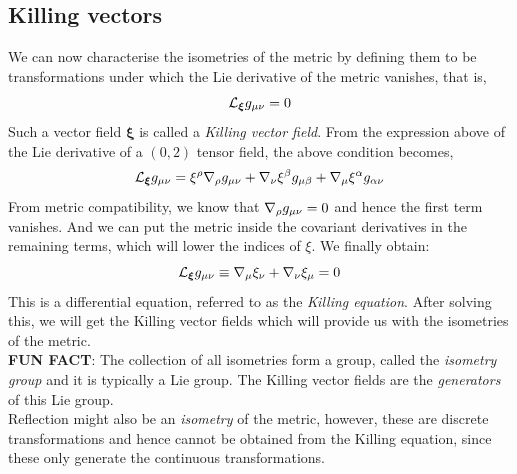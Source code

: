 \subsection{Killing vectors}
We can now characterise the isometries of the metric by defining them to be transformations under which the Lie derivative of the metric vanishes, that is, 
$$\mathcal L_{\boldsymbol{\xi}}g_{\mu\nu} = 0$$
Such a vector field $\boldsymbol{\xi}$ is called a \textit{Killing vector field}. From the expression above of the Lie derivative of a $(0,2)$ tensor field, the above condition becomes,
$$\mathcal L_{\boldsymbol{\xi}}g_{\mu\nu} = \xi^\rho \nabla_{\rho} g_{\mu\nu} + \nabla_{\nu}\xi^\beta g_{\mu\beta} + \nabla_{\mu}\xi^\alpha g_{\alpha\nu}$$
From metric compatibility, we know that $\nabla_{\rho} g_{\mu\nu} =0$ and hence the first term vanishes. And we can put the metric inside the covariant derivatives in the remaining terms, which will lower the indices of $\xi$. We finally obtain:
$$\mathcal L_{\boldsymbol{\xi}}g_{\mu\nu} \equiv \nabla_{\mu}\xi_{\nu}+\nabla_{\nu}\xi_{\mu} =0$$
This is a differential equation, referred to as the \textit{Killing equation}. After solving this, we will get the Killing vector fields which will provide us with the isometries of the metric. \\[0.2cm]
\textbf{FUN FACT}: The collection of all isometries form a group, called the \textit{isometry group} and it is typically a Lie group. The Killing vector fields are the \textit{generators} of this Lie group. \\[0.2cm]
Reflection might also be an \textit{isometry} of the metric, however, these are discrete transformations and hence cannot be obtained from the Killing equation, since these only generate the continuous transformations.